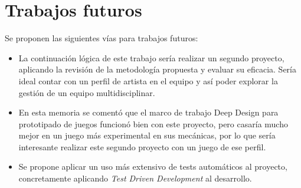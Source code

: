 \section{Trabajos futuros}

Se proponen las siguientes vías para trabajos futuros:

\begin{itemize}
    \item La continuación lógica de este trabajo sería realizar un segundo proyecto, aplicando la revisión de la metodología propuesta y evaluar su eficacia. Sería ideal contar con un perfil de artista en el equipo y así poder explorar la gestión de un equipo multidisciplinar.
    \item En esta memoria se comentó que el marco de trabajo Deep Design para prototipado de juegos funcionó bien con este proyecto, pero casaría mucho mejor en un juego más experimental en sus mecánicas, por lo que sería interesante realizar este segundo proyecto con un juego de ese perfil.
    \item Se propone aplicar un uso más extensivo de tests automáticos al proyecto, concretamente aplicando \textit{Test Driven Development} al desarrollo.
\end{itemize}
